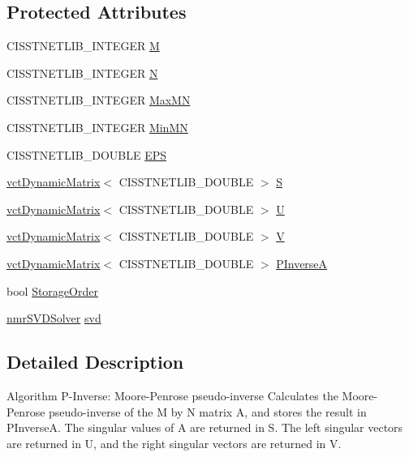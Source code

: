 \subsection*{Protected Attributes}
\begin{DoxyCompactItemize}
\item 
C\+I\+S\+S\+T\+N\+E\+T\+L\+I\+B\+\_\+\+I\+N\+T\+E\+G\+E\+R \hyperlink{classnmr_p_inverse_solver_a7e98835c5d1cf8493784b3789aa49c23}{M}
\item 
C\+I\+S\+S\+T\+N\+E\+T\+L\+I\+B\+\_\+\+I\+N\+T\+E\+G\+E\+R \hyperlink{classnmr_p_inverse_solver_a79a6789487c6022865700e2b4171ce60}{N}
\item 
C\+I\+S\+S\+T\+N\+E\+T\+L\+I\+B\+\_\+\+I\+N\+T\+E\+G\+E\+R \hyperlink{classnmr_p_inverse_solver_aafd3d099ed0e477769c41645744c3acd}{Max\+M\+N}
\item 
C\+I\+S\+S\+T\+N\+E\+T\+L\+I\+B\+\_\+\+I\+N\+T\+E\+G\+E\+R \hyperlink{classnmr_p_inverse_solver_a28485b3520282846c1b0e6f1137da9b2}{Min\+M\+N}
\item 
C\+I\+S\+S\+T\+N\+E\+T\+L\+I\+B\+\_\+\+D\+O\+U\+B\+L\+E \hyperlink{classnmr_p_inverse_solver_a7f262c9d12cdc03828834a3adacf1f52}{E\+P\+S}
\item 
\hyperlink{classvct_dynamic_matrix}{vct\+Dynamic\+Matrix}$<$ C\+I\+S\+S\+T\+N\+E\+T\+L\+I\+B\+\_\+\+D\+O\+U\+B\+L\+E $>$ \hyperlink{classnmr_p_inverse_solver_a76d3263b528c5531acbffe5909e716bd}{S}
\item 
\hyperlink{classvct_dynamic_matrix}{vct\+Dynamic\+Matrix}$<$ C\+I\+S\+S\+T\+N\+E\+T\+L\+I\+B\+\_\+\+D\+O\+U\+B\+L\+E $>$ \hyperlink{classnmr_p_inverse_solver_a25f08dc0a3380bb613f5e79b8cd9678a}{U}
\item 
\hyperlink{classvct_dynamic_matrix}{vct\+Dynamic\+Matrix}$<$ C\+I\+S\+S\+T\+N\+E\+T\+L\+I\+B\+\_\+\+D\+O\+U\+B\+L\+E $>$ \hyperlink{classnmr_p_inverse_solver_af28274cc42c66aa6fd7b48b04b35d249}{V}
\item 
\hyperlink{classvct_dynamic_matrix}{vct\+Dynamic\+Matrix}$<$ C\+I\+S\+S\+T\+N\+E\+T\+L\+I\+B\+\_\+\+D\+O\+U\+B\+L\+E $>$ \hyperlink{classnmr_p_inverse_solver_ae5a338f8aca820d47ac15fae99f29725}{P\+Inverse\+A}
\item 
bool \hyperlink{classnmr_p_inverse_solver_a1b9e3b3842e90c4de100681e8ed5f3a9}{Storage\+Order}
\item 
\hyperlink{classnmr_s_v_d_solver}{nmr\+S\+V\+D\+Solver} \hyperlink{classnmr_p_inverse_solver_ab8b996e0cc032076ff7035a4d471ff03}{svd}
\end{DoxyCompactItemize}


\subsection{Detailed Description}
Algorithm P-\/\+Inverse\+: Moore-\/\+Penrose pseudo-\/inverse Calculates the Moore-\/\+Penrose pseudo-\/inverse of the M by N matrix A, and stores the result in P\+Inverse\+A. The singular values of A are returned in S. The left singular vectors are returned in U, and the right singular vectors are returned in V.

